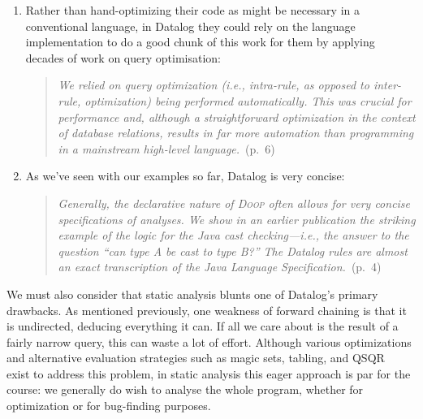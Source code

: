 \begin{enumerate}
\item Rather than hand-optimizing their code as might be necessary in a
  conventional language, in Datalog they could rely on the language
  implementation to do a good chunk of this work for them by applying decades of
  work on query optimisation:

  \begin{quote}
    \emph{We relied on query optimization (i.e., intra-rule, as opposed to
      inter-rule, optimization) being performed automatically. This was crucial
      for performance and, although a straightforward optimization in the
      context of database relations, results in far more automation than
      programming in a mainstream high-level language.}~(p.~6)
  \end{quote}
  
\item As we've seen with our examples so far, Datalog is very concise:
  
  \begin{quote}
    \emph{Generally, the declarative nature of \textsc{Doop} often allows for
      very concise specifications of analyses. We show in an earlier publication
      the striking example of the logic for the Java cast checking---i.e., the
      answer to the question ``can type A be cast to type B?'' The Datalog rules
      are almost an exact transcription of the Java Language
      Specification.}~(p.~4)
  \end{quote}
\end{enumerate}

\noindent
We must also consider that static analysis blunts one of Datalog's primary
drawbacks. As mentioned previously, one weakness of forward chaining is that it
is undirected, deducing everything it can. If all we care about is the result of
a fairly narrow query, this can waste a lot of effort. Although various
optimizations and alternative evaluation strategies such as magic sets, tabling,
and QSQR~ exist to address this
problem, in static analysis this eager approach is par for the course: we
generally do wish to analyse the whole program, whether for optimization or for
bug-finding purposes. 


